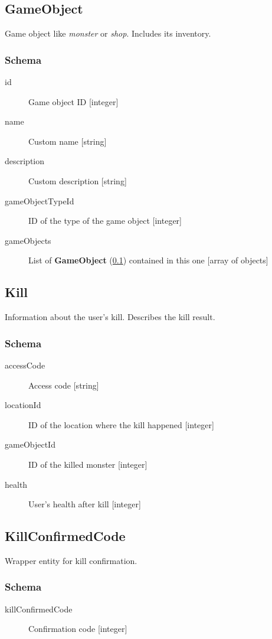 	\subsection{GameObject}
		\label{json:gameobject}
		Game object like \textit{monster} or \textit{shop}. Includes its inventory.

		\subsubsection{Schema}
			\begin{description}
				\item[id] Game object ID [integer]
				\item[name] Custom name [string]
				\item[description] Custom description [string]
				\item[gameObjectTypeId] ID of the type of the game object [integer]
				\item[gameObjects] List of \textbf{GameObject} (\ref{json:gameobject}) contained in this one [array of objects]
			\end{description}
	
	\subsection{Kill}
		\label{json:kill}
		Information about the user's kill. Describes the kill result.
		\subsubsection{Schema}
			\begin{description}
				\item[accessCode] Access code [string]
				\item[locationId] ID of the location where the kill happened [integer]
				\item[gameObjectId] ID of the killed monster [integer]
				\item[health] User's health after kill [integer]
			\end{description}
	
	\subsection{KillConfirmedCode}
		\label{json:killconfirm}
		Wrapper entity for kill confirmation.
		\subsubsection{Schema}
			\begin{description}
				\item[killConfirmedCode] Confirmation code [integer]
			\end{description}
	
